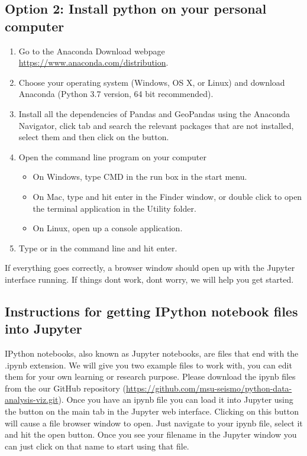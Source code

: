 \documentclass[12pt]{article}   	%
\begin{document}
\subsection*{Option 2: Install python on your personal computer}
\begin{enumerate}[noitemsep]
\item Go to the Anaconda Download webpage \href{https://www.anaconda.com/distribution}{https://www.anaconda.com/distribution}.
\item Choose your operating system (Windows, OS X, or Linux) and download Anaconda (Python 3.7 version, 64 bit recommended).
\item Install all the dependencies of Pandas and GeoPandas using the Anaconda Navigator, click  tab and search the relevant packages that are not installed, select them and then click on the  button.
\item Open the command line program on your computer
\begin{itemize}[noitemsep]
\item On Windows, type CMD in the run box in the start menu.
\item On Mac, type  and hit enter in the Finder window, or double click to open the terminal application in the Utility folder.
\item On Linux, open up a console application.
\end{itemize}
\item Type  or  in the command line and hit enter.
\end{enumerate}

If everything goes correctly, a browser window should open up with the Jupyter interface running. If things don\textquotesingle t work, don\textquotesingle t worry, we will help you get started.

\subsection*{Instructions for getting IPython notebook files into Jupyter}
IPython notebooks, also known as Jupyter notebooks, are files that end with the .ipynb extension. We will give you two example files to work with, you can edit them for your own learning or research 
purpose. Please download the ipynb files from the our GitHub repository
(\href{https://github.com/msu-seismo/python-data-analysis-viz.git}{https://github.com/msu-seismo/python-data-analysis-viz.git}). Once you have an ipynb file you can load it into Jupyter using the
 button on the main  tab in the Jupyter web interface. Clicking on this button will
cause a file browser window to open. Just navigate to your ipynb file, select it and hit the
open button. Once you see your filename in the Jupyter window you can just click on that
name to start using that file. 
\end{document}

